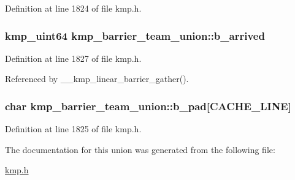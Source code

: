 Definition at line 1824 of file kmp.\-h.

\hypertarget{unionkmp__barrier__team__union_a469318ad3a602e49e4a77b26af50d120}{
\subsubsection[{b\-\_\-arrived}]{\setlength{\rightskip}{0pt plus 5cm}kmp\-\_\-uint64 kmp\-\_\-barrier\-\_\-team\-\_\-union\-::b\-\_\-arrived}}\label{unionkmp__barrier__team__union_a469318ad3a602e49e4a77b26af50d120}


Definition at line 1827 of file kmp.\-h.



Referenced by \-\_\-\-\_\-kmp\-\_\-linear\-\_\-barrier\-\_\-gather().

\hypertarget{unionkmp__barrier__team__union_a47bf784cd8d067b5ac62343d45e03b7d}{
\subsubsection[{b\-\_\-pad}]{\setlength{\rightskip}{0pt plus 5cm}char kmp\-\_\-barrier\-\_\-team\-\_\-union\-::b\-\_\-pad\mbox{[}{\bf C\-A\-C\-H\-E\-\_\-\-L\-I\-N\-E}\mbox{]}}}\label{unionkmp__barrier__team__union_a47bf784cd8d067b5ac62343d45e03b7d}


Definition at line 1825 of file kmp.\-h.



The documentation for this union was generated from the following file\-:\begin{DoxyCompactItemize}
\item 
\hyperlink{kmp_8h}{kmp.\-h}\end{DoxyCompactItemize}
